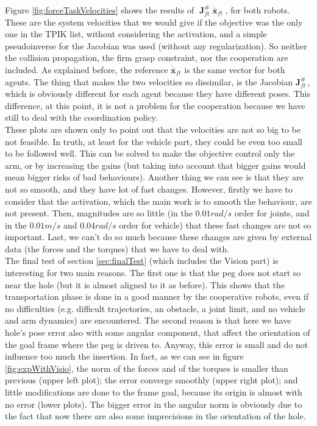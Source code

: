 Figure \ref{fig:forceTaskVelocities} shows the results of $\; \boldsymbol{J}^{\#}_{ft} \; \dot{\bar{\boldsymbol{x}}}_{ft}\;$, for both robots. These are the system velocities that we would give if the objective was the only one in the TPIK list, without considering the activation, and a simple pseudoinverse for the Jacobian was used (without any regularization). So neither the collision propagation, the firm grasp constraint, nor the cooperation are included. As explained before, the reference $\dot{\bar{\boldsymbol{x}}}_{ft}$ is the same vector for both agents. The thing that makes the two velocities so dissimilar, is the Jacobian $\boldsymbol{J}^{\#}_{ft}\,$, which is obviously different for each agent because they have different poses. This difference, at this point, it is not a problem for the cooperation because we have still to deal with the coordination policy.\\
These plots are shown only to point out that the velocities are not so big to be not feasible. In truth, at least for the vehicle part, they could be even too small to be followed well. This can be solved to make the objective control only the arm, or by increasing the gains (but taking into account that bigger gains would mean bigger risks of bad behaviours). Another thing we can see is that they are not so smooth, and they have lot of fast changes. However, firstly we have to consider that the activation, which the main work is to smooth the behaviour, are not present. Then, magnitudes are so little (in the $0.01rad/s$ order for joints, and in the $0.01m/s$ and $0.04rad/s$ order for vehicle) that these fast changes are not so important. Last, we can't do so much because these changes are given by external data (the forces and the torques) that we have to deal with.\\

The final test of section \ref{sec:finalTest} (which includes the Vision part) is interesting for two main reasons. The first one is that the peg does not start so near the hole (but it is almost aligned to it as before). This shows that the transportation phase is done in a good manner by the cooperative robots, even if no difficulties (e.g. difficult trajectories, an obstacle, a joint limit, and no vehicle and arm dynamics) are encountered.
The second reason is that here we have hole's pose error also with some angular component, that affect the orientation of the goal frame where the peg is driven to. Anyway, this error is small and do not influence too much the insertion. In fact, as we can see in figure \ref{fig:expWithVisio}, the norm of the forces and of the torques is smaller than previous (upper left plot); the error converge smoothly (upper right plot); and little modifications are done to the frame goal, because its origin is almost with no error (lower plots). The bigger error in the angular norm is obviously due to the fact that now there are also some imprecisions in the orientation of the hole.\\

